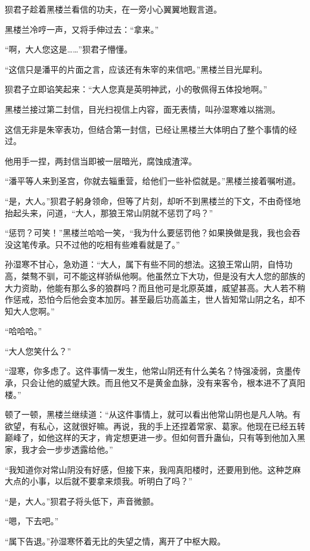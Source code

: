 \begin{this_body}
狈君子趁着黑楼兰看信的功夫，在一旁小心翼翼地觐言道。

黑楼兰冷哼一声，又将手伸过去：“拿来。”

“啊，大人您这是……”狈君子懵懂。

“这信只是潘平的片面之言，应该还有朱宰的来信吧。”黑楼兰目光犀利。

狈君子立即谄笑起来：“大人您真是英明神武，小的敬佩得五体投地啊。”

黑楼兰接过第二封信，目光扫视信上内容，面无表情，叫孙湿寒难以揣测。

这信无非是朱宰表功，但结合第一封信，已经让黑楼兰大体明白了整个事情的经过。

他用手一捏，两封信当即被一层暗光，腐蚀成渣滓。

“潘平等人来到圣宫，你就去辎重营，给他们一些补偿就是。”黑楼兰接着嘱咐道。

“是，大人。”狈君子躬身领命，但等了片刻，却听不到黑楼兰的下文，不由奇怪地抬起头来，问道，“大人，那狼王常山阴就不惩罚了吗？”

“惩罚？可笑！”黑楼兰哈哈一笑，“我为什么要惩罚他？如果换做是我，我也会吞没这笔传承。只不过他的吃相有些难看就是了。”

孙湿寒不甘心，急劝道：“大人，属下有些不同的想法。这狼王常山阴，自恃功高，桀骜不驯，可不能这样骄纵他啊。他虽然立下大功，但是没有大人您的部族的大力资助，他能有那么多的狼群吗？而且他可是北原英雄，威望甚高。大人若不稍作惩戒，恐怕今后他会变本加厉。甚至最后功高盖主，世人皆知常山阴之名，却不知大人您啊。”

“哈哈哈。”

“大人您笑什么？”

“湿寒，你多虑了。这件事情一发生，他常山阴还有什么美名？恃强凌弱，贪墨传承，只会让他的威望大跌。而且他又不是黄金血脉，没有来客令，根本进不了真阳楼。”

顿了一顿，黑楼兰继续道：“从这件事情上，就可以看出他常山阴也是凡人呐。有欲望，有私心，这就很好嘛。再说，我的手上还捏着常家、葛家。他现在已经五转巅峰了，如他这样的天才，肯定想更进一步。但如何晋升蛊仙，只有等到他加入黑家，我才会一步步透露给他。”

“我知道你对常山阴没有好感，但接下来，我闯真阳楼时，还要用到他。这种芝麻大点的小事，以后就不要拿来烦我。听明白了吗？”

“是，大人。”狈君子将头低下，声音微颤。

“嗯，下去吧。”

“属下告退。”孙湿寒怀着无比的失望之情，离开了中枢大殿。

\end{this_body}

